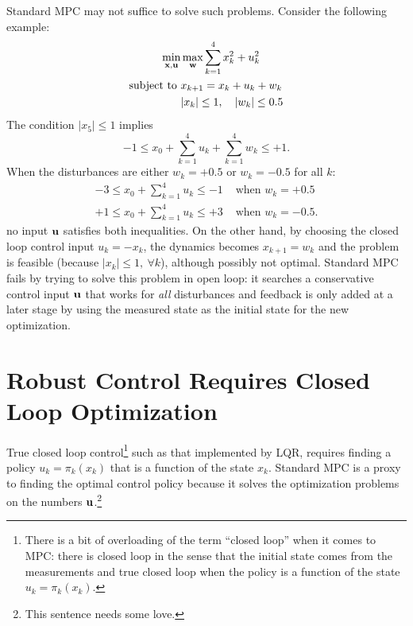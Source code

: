 Standard MPC may not suffice to solve such problems. Consider the following example:
\begin{equation}
  \label{eq:rMPC-unfeasible-problem}
  \begin{aligned}
    \min_{\boldsymbol{\mathrm{x}},\boldsymbol{\mathrm{u}}} & \max_{\boldsymbol{\mathrm{w}}} \sum_{k=1}^{4} x_k^2+u_k^2 \\
    \text{subject to } & x_{k+1} = x_k + u_k + w_k \\
                     & |x_k| \le 1,\quad |w_k| \le 0.5
  \end{aligned}
\end{equation}
The condition $|x_5| \le 1$ implies
\begin{equation*}
  -1\le x_0 + \sum_{k=1}^4 u_k + \sum_{k=1}^4 w_k \le +1.
\end{equation*}
When the disturbances are either $w_k=+0.5$ or $w_k=-0.5$ for all $k$:
\begin{align*}
  -3 \le x_0 + \sum_{k=1}^4 u_k \le -1 & \text{ when } w_k=+0.5 \\
  +1 \le x_0 + \sum_{k=1}^4 u_k \le +3 & \text{ when } w_k=-0.5.
\end{align*}
no input $\boldsymbol{\mathrm{u}}$ satisfies both inequalities. On the other hand, by choosing the closed loop control input $u_k = -x_k$, the dynamics becomes $x_{k+1}=w_k$ and the problem is feasible (because $|x_k|\le 1,\ \forall k$), although possibly not optimal. Standard MPC fails by trying to solve this problem in open loop: it searches a conservative control input $\boldsymbol{\mathrm{u}}$ that works for \emph{all} disturbances and feedback is only added at a later stage by using the measured state as the initial state for the new optimization.

\section{Robust Control Requires Closed Loop Optimization}
\label{sec:closed-loop-robust-control}

True closed loop control\footnote{There is a bit of overloading of the term ``closed loop'' when it comes to MPC: there is closed loop in the sense that the initial state comes from the measurements and true closed loop when the policy is a function of the state $u_k = \pi_k(x_k)$.} such as that implemented by LQR, requires finding a policy $u_k=\pi_k(x_k)$ that is a function of the state $x_k$. Standard MPC is a proxy to finding the optimal control policy because it solves the optimization problems on the numbers $\boldsymbol{\mathrm{u}}$.\footnote{This sentence needs some love.}

